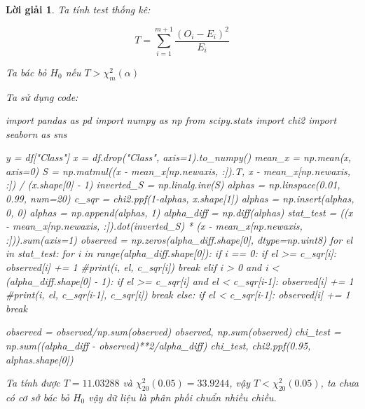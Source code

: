 \documentclass[14pt, a4paper]{article}
\theoremstyle{sltheorem}
\theoremstyle{soltheorem}
\newtheorem*{loigiai}{Lời giải}
\begin{document}
\begin{loigiai}
    Ta tính test thống kê:

    \begin{equation*}
        T = \sum_{i=1}^{m+1} \dfrac{(O_i - E_i)^2}{E_i}
    \end{equation*}

    Ta bác bỏ $H_0$ nếu $T > \chi_m^2(\alpha)$

    Ta sử dụng code:

    \begin{python}
import pandas as pd
import numpy as np
from scipy.stats import chi2
import seaborn as sns

y = df["Class"]
x = df.drop("Class", axis=1).to_numpy()
mean_x = np.mean(x, axis=0)
S = np.matmul((x - mean_x[np.newaxis, :]).T, x - mean_x[np.newaxis, :]) / (x.shape[0] - 1)
inverted_S = np.linalg.inv(S)
alphas = np.linspace(0.01, 0.99, num=20)
c_sqr = chi2.ppf(1-alphas, x.shape[1])
alphas = np.insert(alphas, 0, 0)
alphas = np.append(alphas, 1)
alpha_diff = np.diff(alphas)
stat_test = ((x - mean_x[np.newaxis, :]).dot(inverted_S) * (x - mean_x[np.newaxis, :])).sum(axis=1)
observed = np.zeros(alpha_diff.shape[0], dtype=np.uint8)
for el in stat_test:
    for i in range(alpha_diff.shape[0]):
        if i == 0:
            if el >= c_sqr[i]:
                observed[i] += 1
                #print(i, el, c_sqr[i])
                break
        elif i > 0 and i < (alpha_diff.shape[0] - 1):
            if el >= c_sqr[i] and el < c_sqr[i-1]:
                observed[i] += 1
                #print(i, el, c_sqr[i-1], c_sqr[i])
                break
        else:
            if el < c_sqr[i-1]:
                observed[i] += 1
                break
            
                
observed = observed/np.sum(observed)
observed, np.sum(observed)
chi_test = np.sum((alpha_diff - observed)**2/alpha_diff)
chi_test, chi2.ppf(0.95, alphas.shape[0])
    \end{python}
    
    Ta tính được $T=11.03288$ và $\chi_20^2(0.05)=33.9244$, vậy $T < \chi_20^2(0.05)$, ta chưa có cơ sở bác bỏ $H_0$ vậy dữ liệu là phân phối chuẩn nhiều chiều.


\end{loigiai}
\end{document}

